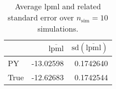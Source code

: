 \begin{table}[H]

\caption{Average lpml and related standard error over $n_{\text{sim}} = 10$ simulations.}
\centering
\begin{tabular}[t]{lrr}
\toprule
  & $\overbar{\text{lpml}}$ & $\text{sd}(\overbar{\text{lpml}})$\\
\midrule
PY & -13.02598 & 0.1742640\\
True & -12.62683 & 0.1742544\\
\bottomrule
\end{tabular}
\end{table}